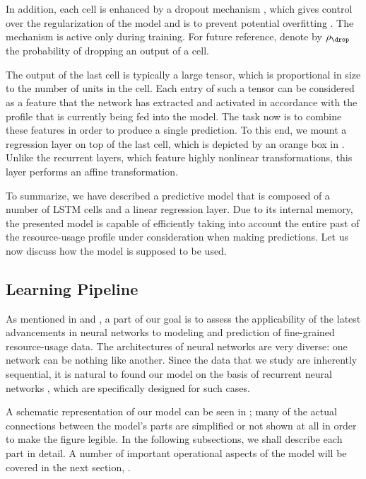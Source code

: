 In addition, each cell is enhanced by a dropout mechanism \cite{zaremba2014},
which gives control over the regularization of the model and is to prevent
potential overfitting \cite{hastie2013}. The mechanism is active only during
training. For future reference, denote by $\rho_\drop$ the probability of
dropping an output of a cell.

The output of the last cell is typically a large tensor, which is proportional
in size to the number of units in the cell. Each entry of such a tensor can be
considered as a feature that the network has extracted and activated in
accordance with the profile that is currently being fed into the model. The task
now is to combine these features in order to produce a single prediction. To
this end, we mount a regression layer on top of the last cell, which is depicted
by an orange box in . Unlike the recurrent layers, which
feature highly nonlinear transformations, this layer performs an affine
transformation.

To summarize, we have described a predictive model that is composed of a number
of \ac{LSTM} cells and a linear regression layer. Due to its internal memory,
the presented model is capable of efficiently taking into account the entire
past of the resource-usage profile under consideration when making predictions.
Let us now discuss how the model is supposed to be used.

\subsection{Learning Pipeline}

As mentioned in  and , a part of our goal is to
assess the applicability of the latest advancements in neural networks
\cite{goodfellow2016} to modeling and prediction of fine-grained resource-usage
data. The architectures of neural networks are very diverse: one network can be
nothing like another. Since the data that we study are inherently sequential, it
is natural to found our model on the basis of recurrent neural networks
\cite{goodfellow2016}, which are specifically designed for such cases.

A schematic representation of our model can be seen in ; many of the
actual connections between the model's parts are simplified or not shown at all
in order to make the figure legible. In the following subsections, we shall
describe each part in detail. A number of important operational aspects of the
model will be covered in the next section, .

